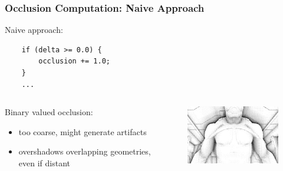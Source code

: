 \documentclass{beamer}
\begin{document}
\begin{frame}[fragile]
\frametitle{Occlusion Computation: Naive Approach}
Naive approach:
\begin{verbatim}
    if (delta >= 0.0) {
        occlusion += 1.0;
    }
    ...
\end{verbatim}

\begin{columns}
    \begin{column}{0.45\linewidth}
        Binary valued occlusion:
        \begin{itemize}
            \item too coarse, might generate artifacts
            \item overshadows overlapping geometries, even if distant
        \end{itemize}
    \end{column}
    \begin{column}{0.45\linewidth}
        \begin{figure}
            \centering
            \includegraphics[width=0.8\linewidth]{images/occlusion_naive}
        \end{figure}
    \end{column}
\end{columns}

\end{frame}
\end{document}
